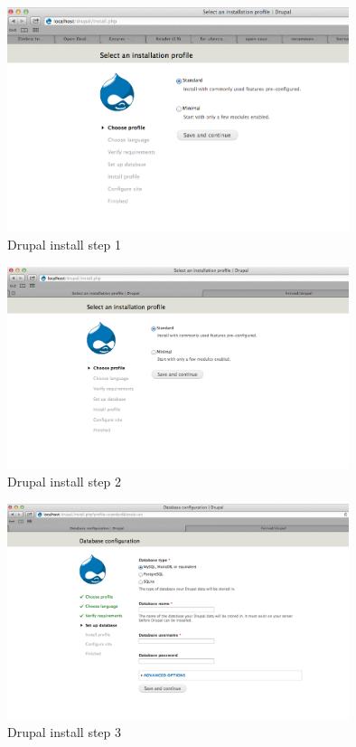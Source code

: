 \documentclass[times, utf8, seminar]{fit}
\begin{document}
{{{\begin{figure}[H]
\centering
\includegraphics[width=10cm]{img/drupal_install_1.png}
\caption{Drupal install step 1}
\end{figure}

\begin{figure}[H]
\centering
\includegraphics[width=10cm]{img/drupal_install_2.png}
\caption{Drupal install step 2}
\end{figure}

\begin{figure}[H]
\centering
\includegraphics[width=10cm]{img/drupal_install_3.png}
\caption{Drupal install step 3}
\end{figure}

}}}
\end{document}
